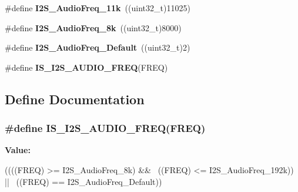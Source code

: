 \begin{DoxyCompactItemize}
\item 
\hypertarget{group__I2S__Audio__Frequency_ga3adf95fadd1ad75670ed1babd5faca39}{
\#define {\bfseries I2S\_\-AudioFreq\_\-11k}~((uint32\_\-t)11025)}
\label{group__I2S__Audio__Frequency_ga3adf95fadd1ad75670ed1babd5faca39}

\item 
\hypertarget{group__I2S__Audio__Frequency_ga7868ac234485a80d45586dd87cd00043}{
\#define {\bfseries I2S\_\-AudioFreq\_\-8k}~((uint32\_\-t)8000)}
\label{group__I2S__Audio__Frequency_ga7868ac234485a80d45586dd87cd00043}

\item 
\hypertarget{group__I2S__Audio__Frequency_ga30f78e8214e8a91cdb6d6360c1d3f18d}{
\#define {\bfseries I2S\_\-AudioFreq\_\-Default}~((uint32\_\-t)2)}
\label{group__I2S__Audio__Frequency_ga30f78e8214e8a91cdb6d6360c1d3f18d}

\item 
\#define {\bfseries IS\_\-I2S\_\-AUDIO\_\-FREQ}(FREQ)
\end{DoxyCompactItemize}


\subsection{Define Documentation}
\hypertarget{group__I2S__Audio__Frequency_gaf39d917f4a38fd9916ec347fb055391c}{
\subsubsection[{IS\_\-I2S\_\-AUDIO\_\-FREQ}]{\setlength{\rightskip}{0pt plus 5cm}\#define IS\_\-I2S\_\-AUDIO\_\-FREQ(FREQ)}}
\label{group__I2S__Audio__Frequency_gaf39d917f4a38fd9916ec347fb055391c}
{\bfseries Value:}
\begin{DoxyCode}
((((FREQ) >= I2S_AudioFreq_8k) && \
                                  ((FREQ) <= I2S_AudioFreq_192k)) || \
                                 ((FREQ) == I2S_AudioFreq_Default))
\end{DoxyCode}
